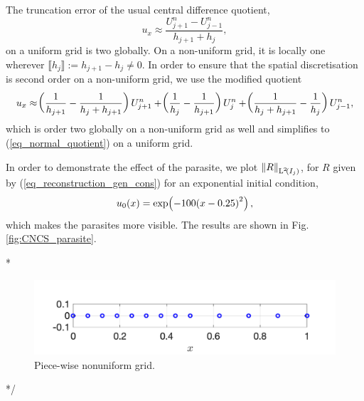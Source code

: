 \documentclass[final]{amsart}
\numberwithin{equation}{section}
\begin{document}
\begin{Rem}\label{rem_central_truncation}
	The truncation error of the usual central difference quotient,
	\begin{equation}\label{eq_normal_quotient}
	u_x\approx \frac{U^n_{j+1}-U^n_{j-1}}{h_{j+1}+h_{j}},
	\end{equation}
	on a uniform grid is two globally. On a non-uniform grid, it is locally one wherever $\llbracket h_j\rrbracket:= h_{j+1}-h_{j}\neq 0$.  In order to ensure that the spatial discretisation is second order on a non-uniform grid, we use the modified  quotient 
	\begin{equation}\label{eq_modified_quotient}
	u_x \approx \!\left({\frac{1}{h_{j+1}} - \frac{1}{h_j+h_{j+1} } }\right)U^n_{j+1} + 
	\!\left({\frac{1}{h_{j}} - \frac{1}{h_{j+1} } }\right)U^n_{j} +
	\!\left({\frac{1}{h_j+h_{j+1} } -\frac{1}{h_{j}} }\right)U^n_{j-1},
	\end{equation}
	which is order two globally  on a non-uniform grid as well and simplifies to (\ref{eq_normal_quotient}) on a uniform grid. 
\end{Rem}
In order to demonstrate the effect of the parasite, we plot $\left\|R\right\|_{\operatorname L^{2}\!\left({I_j}\right)}$, for $R$ given by  (\ref{eq_reconstruction_gen_cons}) for  an exponential initial condition, 
\begin{equation}\label{eq_ic_parasites}
u_0\!\left({x}\right)=\exp\!\left({-100\!\left({x-0.25}\right)^2}\right),
\end{equation}
which makes the parasites more visible.  The results are shown in Fig. \ref{fig:CNCS_parasite}.

\/*
\begin{figure}[H]
	\centering
	\centering
	\includegraphics[scale=.5]{../figures/fig_grid_piecewise_nonu_2}	
	\caption{Piece-wise nonuniform grid.}
	\label{fig_grid_piecewise_nonu}
\end{figure}
*/
\end{document}

